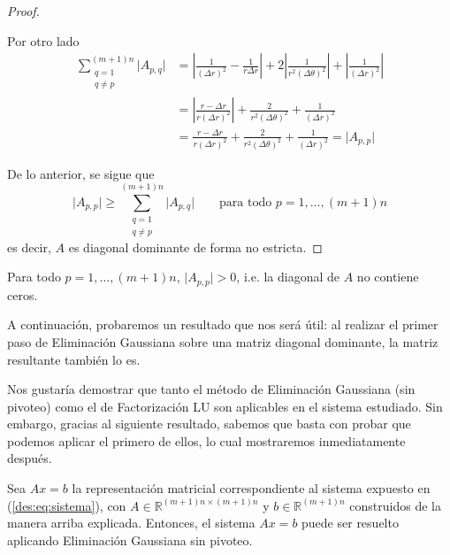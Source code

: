 \begin{proof}
\begin{itemize}
          Por otro lado
            \[ \begin{split}
              \sum_{\substack{q=1 \\ q \neq p}}^{(m+1)n} \vert A_{p,q} \vert &= \left \vert \frac{1}{(\Delta r)^2} - \frac{1}{r \Delta r} \right \vert + 2 \left \vert \frac{1}{r^2 (\Delta \theta)^2} \right \vert + \left \vert \frac{1}{(\Delta r)^2} \right \vert \\
              &= \left \vert \frac{r - \Delta r}{r (\Delta r)^2} \right \vert + \frac{2}{r^2 (\Delta \theta)^2} + \frac{1}{(\Delta r)^2} \\
              &= \frac{r - \Delta r}{r (\Delta r)^2} + \frac{2}{r^2 (\Delta \theta)^2} + \frac{1}{(\Delta r)^2} = \vert A_{p,p} \vert
            \end{split} \]
        \end{itemize}

        De lo anterior, se sigue que
          \[ \vert A_{p,p} \vert \geq \sum_{\substack{q=1 \\ q \neq p}}^{(m+1)n} \vert A_{p,q} \vert \qquad \text{para todo $p = 1, \dots, (m+1)n$} \]
        es decir, $A$ es diagonal dominante de forma no estricta.
      \end{proof}

      \begin{obs}
        \label{obs:Diagonal de A sin ceros}
        Para todo $p = 1, \dots, (m+1)n$, $\vert A_{p,p} \vert > 0$, i.e. la diagonal de $A$ no contiene ceros.
      \end{obs}

      A continuación, probaremos un resultado que nos será útil: al realizar el primer paso de Eliminación Gaussiana sobre una matriz diagonal dominante, la matriz resultante también lo es.



      Nos gustaría demostrar que tanto el método de Eliminación Gaussiana (sin pivoteo) como el de Factorización LU son aplicables en el sistema estudiado. Sin embargo, gracias al siguiente resultado, sabemos que basta con probar que podemos aplicar el primero de ellos, lo cual mostraremos inmediatamente después.



      \begin{prop} \label{prop:Puede aplicarse EG}
        Sea $Ax=b$ la representación matricial correspondiente al sistema expuesto en (\ref{des:eq:sistema}), con $A \in \mathbb{R}^{(m+1)n \times (m+1)n}$ y $b \in \mathbb{R}^{(m+1)n}$ construidos de la manera arriba explicada. Entonces, el sistema $Ax=b$ puede ser resuelto aplicando Eliminación Gaussiana sin pivoteo.
      \end{prop}

